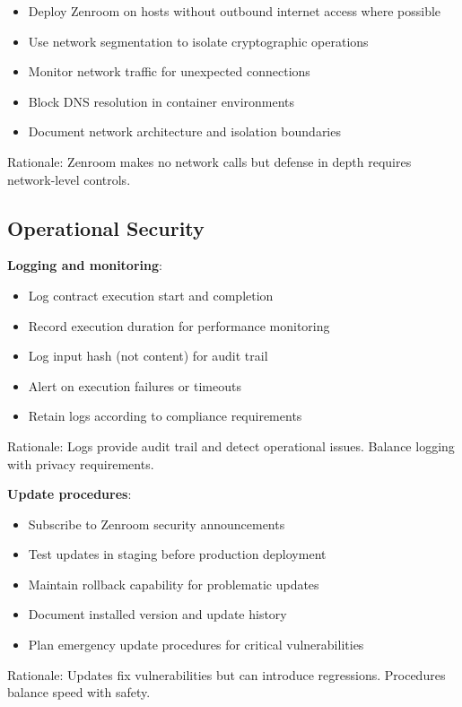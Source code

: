 \begin{itemize}
\item Deploy Zenroom on hosts without outbound internet access where
  possible
\item Use network segmentation to isolate cryptographic operations
\item Monitor network traffic for unexpected connections
\item Block DNS resolution in container environments
\item Document network architecture and isolation boundaries
\end{itemize}

Rationale: Zenroom makes no network calls but defense in depth
requires network-level controls.

\subsection{Operational Security}

\textbf{Logging and monitoring}:

\begin{itemize}
\item Log contract execution start and completion
\item Record execution duration for performance monitoring
\item Log input hash (not content) for audit trail
\item Alert on execution failures or timeouts
\item Retain logs according to compliance requirements
\end{itemize}

Rationale: Logs provide audit trail and detect operational
issues. Balance logging with privacy requirements.

\textbf{Update procedures}:

\begin{itemize}
\item Subscribe to Zenroom security announcements
\item Test updates in staging before production deployment
\item Maintain rollback capability for problematic updates
\item Document installed version and update history
\item Plan emergency update procedures for critical vulnerabilities
\end{itemize}

Rationale: Updates fix vulnerabilities but can introduce
regressions. Procedures balance speed with safety.

